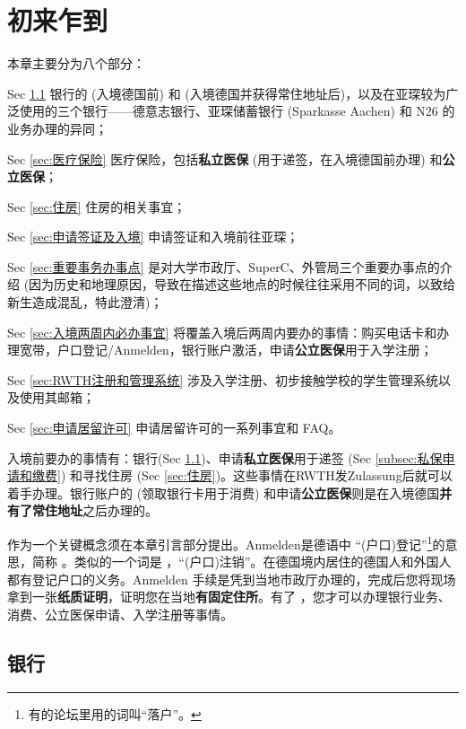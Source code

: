 
\chapter{初来乍到}\label{chap:初来乍到}

  本章主要分为八个部分：

  Sec \ref{sec:银行} 银行的 (入境德国前) 和 (入境德国并获得常住地址后)，以及在亚琛较为广泛使用的三个银行——德意志银行、亚琛储蓄银行 (Sparkasse Aachen) 和 N26 的业务办理的异同；

  Sec \ref{sec:医疗保险} 医疗保险，包括\textbf{私立医保} (用于递签，在入境德国前办理) 和\textbf{公立医保}；

  Sec \ref{sec:住房} 住房的相关事宜；

  Sec \ref{sec:申请签证及入境} 申请签证和入境前往亚琛；

  Sec \ref{sec:重要事务办事点} 是对大学市政厅、SuperC、外管局三个重要办事点的介绍 (因为历史和地理原因，导致在描述这些地点的时候往往采用不同的词，以致给新生造成混乱，特此澄清)；

  Sec \ref{sec:入境两周内必办事宜} 将覆盖入境后两周内要办的事情：购买电话卡和办理宽带，户口登记/Anmelden，银行账户激活，申请\textbf{公立医保}用于入学注册；

  Sec \ref{sec:RWTH注册和管理系统} 涉及入学注册、初步接触学校的学生管理系统以及使用其邮箱；

  Sec \ref{sec:申请居留许可} 申请居留许可的一系列事宜和 FAQ。

  入境前要办的事情有：银行(Sec \ref{sec:银行})、申请\textbf{私立医保}用于递签 (Sec \ref{subsec:私保申请和缴费}) 和寻找住房 (Sec \ref{sec:住房})。这些事情在RWTH发Zulassung后就可以着手办理。银行账户的 (领取银行卡用于消费) 和申请\textbf{公立医保}则是在入境德国\textbf{并有了常住地址}之后办理的。

   作为一个关键概念须在本章引言部分提出。Anmelden是德语中 ``(户口)登记''\footnote{有的论坛里用的词叫``落户''。}的意思，简称 。类似的一个词是 ，``(户口)注销''。在德国境内居住的德国人和外国人都有登记户口的义务。Anmelden 手续是凭到当地市政厅办理的，完成后您将现场拿到一张\textbf{纸质证明}，证明您在当地\textbf{有固定住所}。有了 ，您才可以办理银行业务、消费、公立医保申请、入学注册等事情。

\section{银行}\label{sec:银行}

